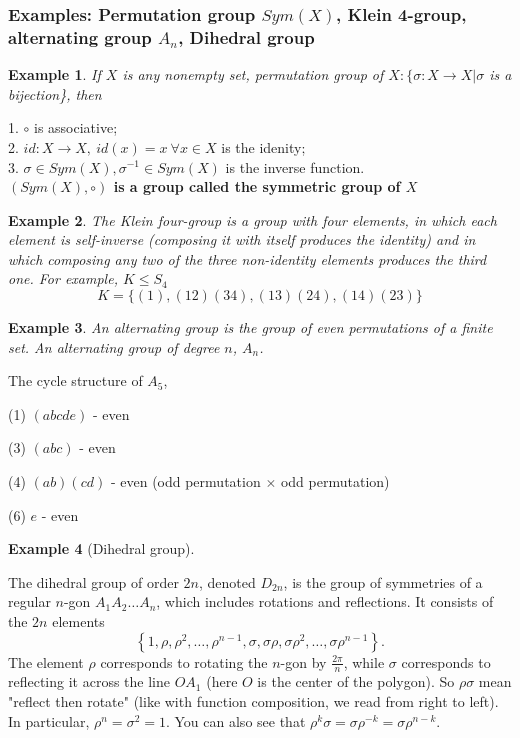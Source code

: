 \documentclass[11pt,a4paper]{article}
\newtheorem{example}{Example}
\begin{document}
\subsubsection{Examples: Permutation group $Sym(X)$, Klein 4-group, alternating group $A_n$, Dihedral group}
\begin{example}
If $X$ is any nonempty set, permutation group of $X: \{\sigma:X \rightarrow X| \sigma$ is a bijection\}, then
\end{example}
1. $\circ$ is associative;\\
2. $id: X \rightarrow X,\ id(x)=x\ \forall x\in X$ is the idenity;\\
3. $\sigma\in Sym(X), \sigma^{-1}\in Sym(X)$ is the inverse function.\\
\textbf{$(Sym(X),\circ)$ is a group called the symmetric group of $X$}

\begin{example}
    The Klein four-group is a group with four elements, in which each element is self-inverse (composing it with itself produces the identity) and in which composing any two of the three non-identity elements produces the third one. For example, $K\leq S_4$
    $$K=\{(1),(12)(34),(13)(24),(14)(23)\}$$
\end{example}

\begin{example}
    An alternating group is the group of even permutations of a finite set. An alternating group of degree $n$, $A_n$.
\end{example}
The cycle structure of $A_5$,

(1) $(a b c d e)$ - even

(3) $(a b c)$ - even

(4) $(a b)(c d)$ - even (odd permutation $\times$ odd permutation)

(6) $e$ - even

\begin{example}[Dihedral group]
\end{example}
The dihedral group of order $2 n$, denoted $D_{2 n}$, is the group of symmetries of a regular $n$-gon $A_{1} A_{2} \ldots A_{n}$, which includes rotations and reflections. It consists of the $2 n$ elements
$$
\left\{1, \rho, \rho^{2}, \ldots, \rho^{n-1}, \sigma, \sigma \rho, \sigma \rho^{2}, \ldots, \sigma \rho^{n-1}\right\} .
$$
The element $\rho$ corresponds to rotating the $n$-gon by $\frac{2 \pi}{n}$, while $\sigma$ corresponds to reflecting it across the line $O A_{1}$ (here $O$ is the center of the polygon). So $\rho \sigma$ mean "reflect then rotate" (like with function composition, we read from right to left).
In particular, $\rho^{n}=\sigma^{2}=1$. You can also see that $\rho^{k} \sigma=\sigma \rho^{-k}=\sigma\rho^{n-k}$.
\end{document}

